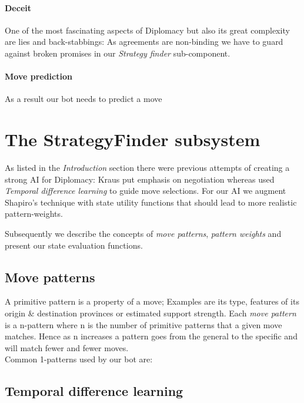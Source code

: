 \documentclass[pdftex,12pt,a4paper]{report}
\begin{document}
\paragraph{Deceit}
One of the most fascinating aspects of Diplomacy but also its great
complexity are lies and back-stabbings: As agreements are non-binding
we have to guard against broken promises in our \textit{Strategy finder}
sub-component. 

\paragraph{Move prediction}
As a result our bot needs to predict a move 


\section{The StrategyFinder subsystem}

As listed in the \textit{Introduction} section there were previous
attempts of creating a strong AI for Diplomacy: Kraus \cite{Kraus95}
put emphasis on negotiation whereas \cite{Shapiro02} used
\textit{Temporal difference learning} to guide move selections. For
our AI we augment Shapiro's technique with state utility functions
that should lead to more realistic pattern-weights.

Subsequently we describe the concepts of \textit{move patterns},
\textit{pattern weights} and present our state evaluation functions.

\subsection{Move patterns}

A primitive pattern is a property of a move; Examples are its type,
features of its origin \& destination provinces or estimated support
strength. Each \textit{move pattern} is a n-pattern where n is the
number of primitive patterns that a given move matches. Hence as n
increases a pattern goes from the general to the specific and will
match fewer and fewer moves. \\

Common 1-patterns used by our bot are:



\subsection{Temporal difference learning}
\end{document}
